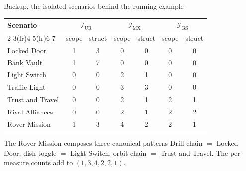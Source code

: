 \begin{frame}[noframenumbering]{Backup, the isolated scenarios behind the running example}
    \hypertarget{bk:signatures}{}
    \begin{center}
        \scriptsize
        \begin{tabular}{l cc cc cc}
            \toprule
            Scenario         & \multicolumn{2}{c}{$\mathcal{I}_{\text{UR}}$} & \multicolumn{2}{c}{$\mathcal{I}_{\text{MX}}$} & \multicolumn{2}{c}{$\mathcal{I}_{\text{GS}}$}                           \\
            \cmidrule(lr){2-3}\cmidrule(lr){4-5}\cmidrule(lr){6-7}
                             & scope                                         & struct                                        & scope                                         & struct & scope & struct \\
            \midrule
            Locked Door      & 1                                             & 3                                             & 0                                             & 0      & 0     & 0      \\
            Bank Vault       & 1                                             & 7                                             & 0                                             & 0      & 0     & 0      \\
            Light Switch     & 0                                             & 0                                             & 2                                             & 1      & 0     & 0      \\
            Traffic Light    & 0                                             & 0                                             & 3                                             & 3      & 0     & 0      \\
            Trust and Travel & 0                                             & 0                                             & 2                                             & 1      & 2     & 1      \\
            Rival Alliances  & 0                                             & 0                                             & 2                                             & 1      & 2     & 2      \\
            \midrule
            Rover Mission    & 1                                             & 3                                             & 4                                             & 2      & 2     & 1      \\
            \bottomrule
        \end{tabular}
    \end{center}

    \begin{block}{The Rover Mission composes three canonical patterns}
        Drill chain $=$ Locked Door, dish toggle $=$ Light Switch, orbit chain $=$ Trust and Travel. The per-measure counts add to $(1, 3, 4, 2, 2, 1)$.
    \end{block}

\end{frame}

